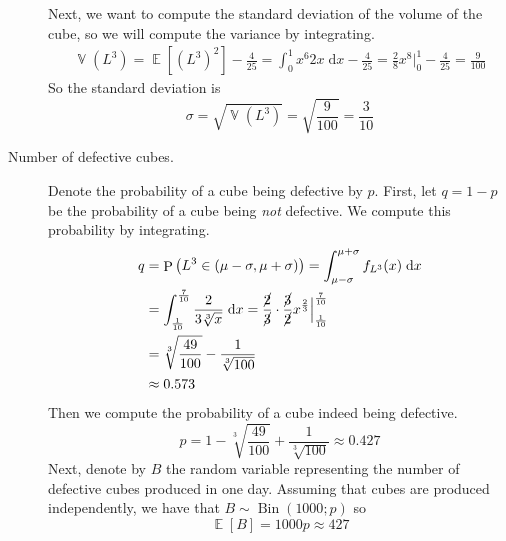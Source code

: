 \documentclass[11pt]{article}
\theoremstyle{definition}
\theoremstyle{remark}
\newcommand{\parens}[1]{\left(#1\right)}
\renewcommand{\d}{\mathrm{d}}
\newcommand{\intd}{\;\d}
\newcommand{\evaluated}[2]{
    \Big\vert_{#1}^{#2}
}
\DeclareMathOperator{\Prob}{P}
\renewcommand{\P}[1]{\Prob{\parens{#1}}}
\DeclareMathOperator{\Expect}{\mathbb{E}}
\newcommand{\E}[1]{\Expect{\left[#1\right]}}
\DeclareMathOperator{\Var}{\mathbb{V}}
\newcommand{\V}[1]{\Var{\parens{#1}}}
\DeclareMathOperator{\BinOp}{Bin}
\newcommand{\Bin}[1]{ \BinOp\parens{#1} }
\begin{document}
\begin{description}
        Next, we want to compute the standard deviation of the volume of the
        cube, so we will compute the variance by integrating.
        \begin{align*}
            \V{L^3}
            = \E{(L^3)^2} - \frac{4}{25}
            = \int_0^1 x^6 2x \intd x - \frac{4}{25}
            = \frac{2}{8} x^8 \evaluated{0}{1} - \frac{4}{25}
            = \frac{9}{100}
        \end{align*}
        So the standard deviation is
        \begin{equation*}
            \sigma
            = \sqrt{\V{L^3}}
            = \sqrt{\frac{9}{100}}
            = \frac{3}{10}
        \end{equation*}
    \item[Number of defective cubes.]
        Denote the probability of a cube being defective by $p$.
        First, let $q = 1 - p$ be the probability of a cube being \emph{not}
        defective.
        We compute this probability by integrating.
        \newcommand{\lo}{\frac{1}{10}}
        \newcommand{\hi}{\frac{7}{10}}
        \newcommand{\theint}{\int_\lo^\hi}
        \renewcommand{\c}{\cancel}
        \begin{align*}
            q
            &= \P{L^3 \in (\mu - \sigma, \mu + \sigma)}
                = \int_{\mu-\sigma}^{\mu+\sigma} f_{L^3} (x) \intd x \\
            &= \theint \frac{2}{3 \sqrt[3]{x}} \intd x
                = \frac{\c 2}{\c 3} \cdot \frac{\c 3}{\c 2} x^{\frac{2}{3}}
                    \evaluated{\lo}{\hi} \\
            &= \sqrt[3]{\frac{49}{100}} - \frac{1}{\sqrt[3]{100}} \\
            &\approx 0.573
        \end{align*}
        Then we compute the probability of a cube indeed being defective.
        \begin{equation*}
            p
            = 1 - \sqrt[3]{\frac{49}{100}} + \frac{1}{\sqrt[3]{100}}
            \approx 0.427
        \end{equation*}
        Next, denote by $B$ the random variable representing the number of
        defective cubes produced in one day.
        Assuming that cubes are produced independently,
        we have that $B \sim \Bin{1000;p}$ so
        \begin{equation*}
            \E{B} = 1000p \approx 427
        \end{equation*}
\end{description}
\end{document}
